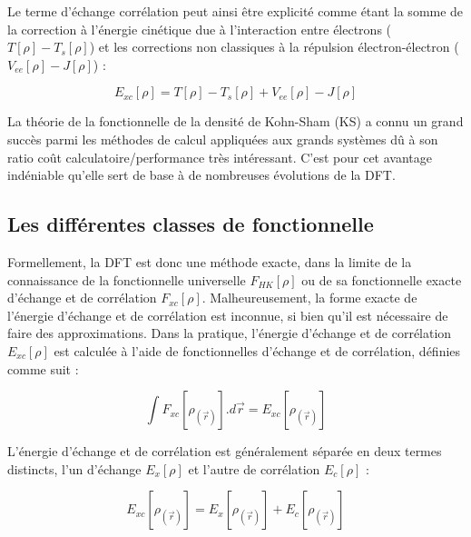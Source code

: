 Le terme d'échange corrélation peut ainsi être explicité comme étant la somme de la correction à l'énergie cinétique due à l'interaction entre électrons ($T[\rho] - T_{s}[\rho]$) et les corrections non classiques à la répulsion électron-électron ($V_{ee}[\rho] - J[\rho]$) :

\begin{equation}
E_{xc}[\rho] = T[\rho] - T_{s}[\rho] + V_{ee}[\rho] - J[\rho]
\end{equation}

La théorie de la fonctionnelle de la densité de Kohn-Sham (KS) a connu un grand succès parmi les méthodes de calcul appliquées aux grands systèmes dû à son ratio coût calculatoire/performance très intéressant. C'est pour cet avantage indéniable qu'elle sert de base à de nombreuses évolutions de la DFT.

\subsection{Les différentes classes de fonctionnelle}

Formellement, la DFT est donc une méthode exacte, dans la limite de la connaissance de la fonctionnelle universelle $F_{HK}[\rho]$ ou de sa fonctionnelle exacte d’échange et de corrélation $F_{xc}[\rho]$. Malheureusement, la forme exacte de l’énergie d’échange et de corrélation est inconnue, si bien qu’il est nécessaire de faire des approximations. Dans la pratique, l’énergie d’échange et de corrélation $E_{xc}[\rho]$ est calculée à l’aide de fonctionnelles d’échange et de corrélation, définies comme suit :

\begin{equation}
\int F_{xc}[\rho_{(\vec{r})}].d\vec{r} = E_{xc}[\rho_{(\vec{r})}]
\end{equation}

L’énergie d’échange et de corrélation est généralement séparée en deux termes distincts, l’un d’échange $E_{x}[\rho]$ et l’autre de corrélation $E_{c}[\rho]$ :

\begin{equation}
E_{xc}[\rho_{(\vec{r})}] = E_{x}[\rho_{(\vec{r})}] + E_{c}[\rho_{(\vec{r})}]
\end{equation}

